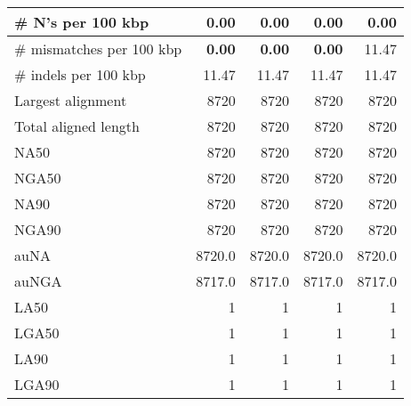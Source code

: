 \documentclass[12pt,a4paper]{article}
\begin{document}
\begin{table}[ht]
\begin{center}
\begin{tabular}{|l*{4}{|r}|}
\# N's per 100 kbp & 0.00 & 0.00 & 0.00 & 0.00 \\ \hline
\# mismatches per 100 kbp & {\bf 0.00} & {\bf 0.00} & {\bf 0.00} & 11.47 \\ \hline
\# indels per 100 kbp & 11.47 & 11.47 & 11.47 & 11.47 \\ \hline
Largest alignment & 8720 & 8720 & 8720 & 8720 \\ \hline
Total aligned length & 8720 & 8720 & 8720 & 8720 \\ \hline
NA50 & 8720 & 8720 & 8720 & 8720 \\ \hline
NGA50 & 8720 & 8720 & 8720 & 8720 \\ \hline
NA90 & 8720 & 8720 & 8720 & 8720 \\ \hline
NGA90 & 8720 & 8720 & 8720 & 8720 \\ \hline
auNA & 8720.0 & 8720.0 & 8720.0 & 8720.0 \\ \hline
auNGA & 8717.0 & 8717.0 & 8717.0 & 8717.0 \\ \hline
LA50 & 1 & 1 & 1 & 1 \\ \hline
LGA50 & 1 & 1 & 1 & 1 \\ \hline
LA90 & 1 & 1 & 1 & 1 \\ \hline
LGA90 & 1 & 1 & 1 & 1 \\ \hline
\end{tabular}
\end{center}
\end{table}
\end{document}
